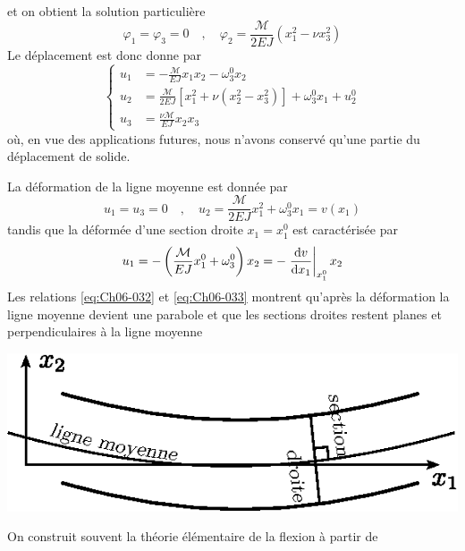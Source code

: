 et on obtient la solution particulière 
\begin{equation}
    \varphi_1 = \varphi_3 = 0 \quad , \quad \varphi_2 = \frac{\mathcal{M}}{2EJ} \left( x_1^2 - \nu x_3^2 \right)
    \label{eq:Ch07-030}
\end{equation}
Le déplacement est donc donne par
\begin{equation}
    \left\{
    \begin{aligned}
        u_1 & = -\frac{\mathcal{M}}{EJ} x_1x_2 -\omega_3^0x_2 \\
        u_2 & = \frac{\mathcal{M}}{2EJ} \left[ x_1^2 + \nu \left( x_2^2 - x_3^2 \right) \right] +\omega_3^0x_1 +u_2^0 \\
        u_3 & = \frac{\nu\mathcal{M}}{EJ} x_2x_3
    \end{aligned}
    \right.
    \label{eq:Ch07-031}
\end{equation}
où, en vue des applications futures, nous n'avons conservé qu'une partie du déplacement de solide.

La déformation de la ligne moyenne est donnée par
\begin{equation}
    u_1 = u_3 = 0 \quad , \quad u_2 = \frac{\mathcal{M}}{2EJ}x_1^2 + \omega_3^0 x_1 = v(x_1)
    \label{eq:Ch07-032}
\end{equation}
tandis que la déformée d'une section droite $x_1=x_1^0$ est caractérisée par
\begin{equation}
    u_1 = - \left( \frac{\mathcal{M}}{EJ}x_1^0 + \omega_3^0 \right) x_2 = - \left.\frac{\mathrm{d} v}{\mathrm{d} x_1}\right|_{x_1^0} x_2
    \label{eq:Ch06-033}
\end{equation}
Les relations \eqref{eq:Ch06-032} et \eqref{eq:Ch06-033} montrent qu'après la déformation la ligne moyenne devient une parabole et que les sections droites restent planes et perpendiculaires à la ligne moyenne
\begin{center}
    \includegraphics{../images/T1_Ch07-06}
\end{center}

On construit souvent la théorie élémentaire de la flexion à partir de
